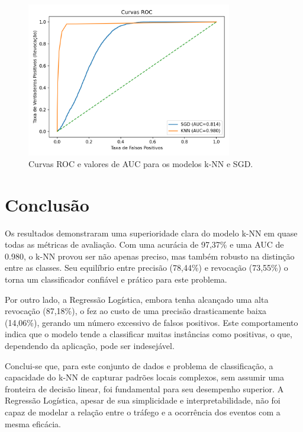 \documentclass[12pt]{article}
\begin{document}
\begin{figure}[h!]
    \centering
    \includegraphics[width=0.8\textwidth]{image/roc_both.png}
    \caption{Curvas ROC e valores de AUC para os modelos k-NN e SGD.}
    \label{fig:roc}
\end{figure}


\section{Conclusão}

Os resultados demonstraram uma superioridade clara do modelo k-NN em quase todas as métricas de avaliação. Com uma acurácia de 97,37\% e uma AUC de 0.980, o k-NN provou ser não apenas preciso, mas também robusto na distinção entre as classes. Seu equilíbrio entre precisão (78,44\%) e revocação (73,55\%) o torna um classificador confiável e prático para este problema.

Por outro lado, a Regressão Logística, embora tenha alcançado uma alta revocação (87,18\%), o fez ao custo de uma precisão drasticamente baixa (14,06\%), gerando um número excessivo de falsos positivos. Este comportamento indica que o modelo tende a classificar muitas instâncias como positivas, o que, dependendo da aplicação, pode ser indesejável.

Conclui-se que, para este conjunto de dados e problema de classificação, a capacidade do k-NN de capturar padrões locais complexos, sem assumir uma fronteira de decisão linear, foi fundamental para seu desempenho superior. A Regressão Logística, apesar de sua simplicidade e interpretabilidade, não foi capaz de modelar a relação entre o tráfego e a ocorrência dos eventos com a mesma eficácia.



\end{document}
